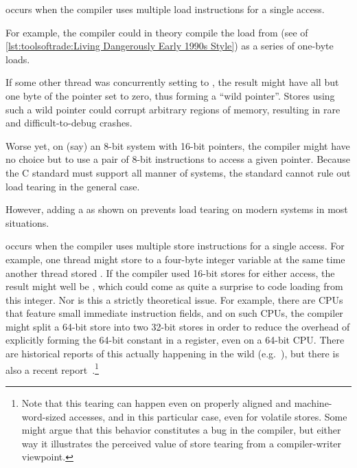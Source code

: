 \begin{description}[labelsep=.4em]
\item[Load tearing] occurs when the compiler uses multiple load
instructions for a single access.
\begin{fcvref}
For example, the compiler could in theory compile the load from
 (see  of
\cref{lst:toolsoftrade:Living Dangerously Early 1990s Style})
as a series of one-byte loads.
\end{fcvref}
If some other thread was concurrently setting  to
, the result might have all but one byte of the pointer
set to zero, thus forming a ``wild pointer''.
Stores using such a wild pointer could corrupt arbitrary
regions of memory, resulting in rare and difficult-to-debug crashes.

Worse yet, on (say) an 8-bit system with 16-bit pointers, the compiler
might have no choice but to use a pair of 8-bit instructions to access
a given pointer.
Because the C standard must support all manner of systems, the standard
cannot rule out load tearing in the general case.

\begin{fcvref}
However, adding a  as shown on  prevents load
tearing on modern systems in most situations.
\end{fcvref}

\item[Store tearing] occurs when the compiler uses multiple store
instructions for a single access.
For example, one thread might store  to a four-byte integer
variable at the same time another thread stored .
If the compiler used 16-bit stores for either access, the result
might well be , which could come as quite a surprise to
code loading from this integer.
Nor is this a strictly theoretical issue.
For example, there are CPUs that feature small immediate instruction
fields, and on such CPUs, the compiler might split a 64-bit store into
two 32-bit stores in order to reduce the overhead of explicitly forming
the 64-bit constant in a register, even on a 64-bit CPU\@.
There are historical reports of this actually happening in
the wild (e.g.~\cite{KonstantinKhlebnikov2013gccstoretearing}),
but there is also a recent
report~\cite{WillDeacon2019StoreTearingReport}.\footnote{
	Note that this tearing can happen even on properly aligned
	and machine-word-sized accesses, and in this particular case,
	even for volatile stores.
	Some might argue that this behavior constitutes a bug in the
	compiler, but either way it illustrates the perceived value of
	store tearing from a compiler-writer viewpoint.
}


\end{description}
